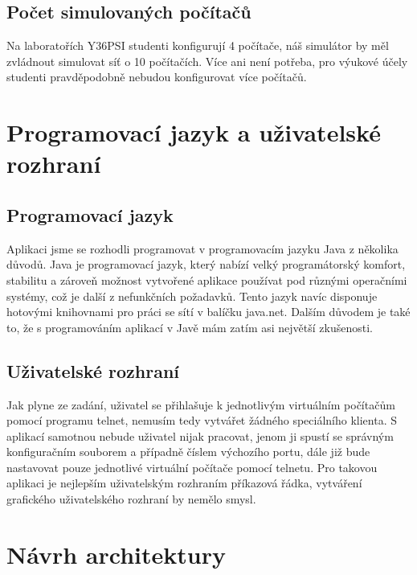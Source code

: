\subsection{Počet simulovaných počítačů}

Na laboratořích Y36PSI studenti konfigurují 4 počítače, náš simulátor by měl zvládnout simulovat síť o 10 počítačích. Více ani není potřeba, pro výukové účely studenti pravděpodobně nebudou konfigurovat více počítačů.




\section{Programovací jazyk a uživatelské rozhraní}

\subsection{Programovací jazyk}
Aplikaci jsme se rozhodli programovat v programovacím jazyku Java z několika důvodů. Java je programovací jazyk, který nabízí velký programátorský komfort, stabilitu a zároveň možnost vytvořené aplikace používat pod různými operačními systémy, což je další z nefunkčních požadavků. Tento jazyk navíc disponuje hotovými knihovnami pro práci se sítí v balíčku java.net. Dalším důvodem je také to, že s programováním aplikací v Javě mám zatím asi největší zkušenosti.

\subsection{Uživatelské rozhraní}

Jak plyne ze zadání, uživatel se přihlašuje k jednotlivým virtuálním počítačům pomocí programu telnet, nemusím tedy vytvářet žádného speciálního klienta. S aplikací samotnou nebude uživatel nijak pracovat, jenom ji spustí se správným konfiguračním souborem a případně číslem výchozího portu, dále již bude nastavovat pouze jednotlivé virtuální počítače pomocí telnetu. Pro takovou aplikaci je nejlepším uživatelským rozhraním příkazová řádka, vytváření grafického uživatelského rozhraní by nemělo smysl.




\section{Návrh architektury}

